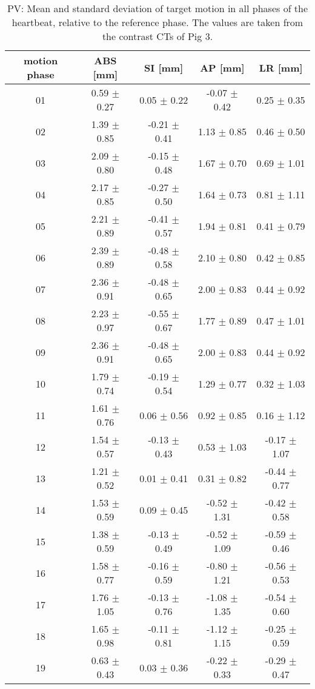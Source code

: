\newpage

\begin{table}[H]
  \centering
  \scriptsize
  \caption{PV: Mean and standard deviation of target motion in all phases of the heartbeat, relative to the reference phase. The values are 
  taken from the contrast CTs of Pig 3.}
  \begin{tabular}{|c|c|c|c|c|}
    \hline\hline
    motion phase\rule{0pt}{2.6ex}\rule[-1.2ex]{0pt}{0pt} & ABS [mm] & SI [mm] & AP [mm] & LR [mm]\\
    \hline
01 &0.59 $\pm$ 0.27 &0.05 $\pm$ 0.22 &-0.07 $\pm$ 0.42 &0.25 $\pm$ 0.35 \\
02 &1.39 $\pm$ 0.85 &-0.21 $\pm$ 0.41 &1.13 $\pm$ 0.85 &0.46 $\pm$ 0.50 \\
03 &2.09 $\pm$ 0.80 &-0.15 $\pm$ 0.48 &1.67 $\pm$ 0.70 &0.69 $\pm$ 1.01 \\
04 &2.17 $\pm$ 0.85 &-0.27 $\pm$ 0.50 &1.64 $\pm$ 0.73 &0.81 $\pm$ 1.11 \\
05 &2.21 $\pm$ 0.89 &-0.41 $\pm$ 0.57 &1.94 $\pm$ 0.81 &0.41 $\pm$ 0.79 \\
06 &2.39 $\pm$ 0.89 &-0.48 $\pm$ 0.58 &2.10 $\pm$ 0.80 &0.42 $\pm$ 0.85 \\
07 &2.36 $\pm$ 0.91 &-0.48 $\pm$ 0.65 &2.00 $\pm$ 0.83 &0.44 $\pm$ 0.92 \\
08 &2.23 $\pm$ 0.97 &-0.55 $\pm$ 0.67 &1.77 $\pm$ 0.89 &0.47 $\pm$ 1.01 \\
09 &2.36 $\pm$ 0.91 &-0.48 $\pm$ 0.65 &2.00 $\pm$ 0.83 &0.44 $\pm$ 0.92 \\
10 &1.79 $\pm$ 0.74 &-0.19 $\pm$ 0.54 &1.29 $\pm$ 0.77 &0.32 $\pm$ 1.03 \\
11 &1.61 $\pm$ 0.76 &0.06 $\pm$ 0.56 &0.92 $\pm$ 0.85 &0.16 $\pm$ 1.12 \\
12 &1.54 $\pm$ 0.57 &-0.13 $\pm$ 0.43 &0.53 $\pm$ 1.03 &-0.17 $\pm$ 1.07 \\
13 &1.21 $\pm$ 0.52 &0.01 $\pm$ 0.41 &0.31 $\pm$ 0.82 &-0.44 $\pm$ 0.77 \\
14 &1.53 $\pm$ 0.59 &0.09 $\pm$ 0.45 &-0.52 $\pm$ 1.31 &-0.42 $\pm$ 0.58 \\
15 &1.38 $\pm$ 0.59 &-0.13 $\pm$ 0.49 &-0.52 $\pm$ 1.09 &-0.59 $\pm$ 0.46 \\
16 &1.58 $\pm$ 0.77 &-0.16 $\pm$ 0.59 &-0.80 $\pm$ 1.21 &-0.56 $\pm$ 0.53 \\
17 &1.76 $\pm$ 1.05 &-0.13 $\pm$ 0.76 &-1.08 $\pm$ 1.35 &-0.54 $\pm$ 0.60 \\
18 &1.65 $\pm$ 0.98 &-0.11 $\pm$ 0.81 &-1.12 $\pm$ 1.15 &-0.25 $\pm$ 0.59 \\
19 &0.63 $\pm$ 0.43 &0.03 $\pm$ 0.36 &-0.22 $\pm$ 0.33 &-0.29 $\pm$ 0.47 \\
    \hline\hline
  \end{tabular}
  \label{tab:motion:PV:Pig3}
\end{table}


